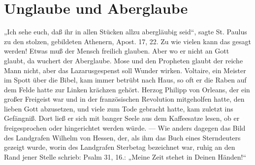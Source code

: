 \chapter{Unglaube und Aberglaube}

„Ich sehe euch, daß ihr in allen Stücken allzu abergläubig seid“, sagte St. Paulus zu den stolzen, gebildeten Athenern, Apost. 17, 22. Zu wie vielen kann das gesagt werden! Etwas muß der Mensch freilich glauben. Aber wo er nicht an Gott glaubt, da wuchert der Aberglaube. Mose und den Propheten glaubt der reiche Mann nicht, aber das Lazarusgespenst soll Wunder wirken. Voltaire, ein Meister im Spott über die Bibel, kam immer betrübt nach Haus, so oft er die Raben auf dem Felde hatte zur Linken krächzen gehört. Herzog Philipp von Orleans, der ein großer Freigeist war und in der französischen Revolution mitgeholfen hatte, den lieben Gott abzusetzen, und viele zum Tode gebracht hatte, kam zuletzt ins Gefängniß. Dort ließ er sich mit banger Seele aus dem Kaffeesatze lesen, ob er
freigesprochen
oder hingerichtet werden würde. — Wie anders dagegen das Bild des Landgrafen Wilhelm von Hessen, der, als ihm das Buch eines Sterndeuters gezeigt wurde, worin des Landgrafen Sterbetag bezeichnet war, ruhig an den Rand jener Stelle schrieb: Psalm 31, 16.: „Meine Zeit stehet in Deinen Händen!“

